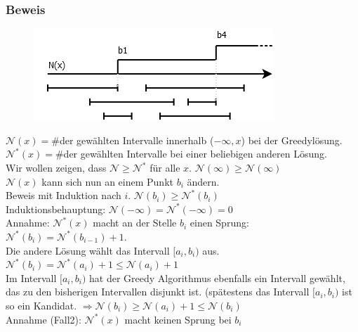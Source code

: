 \subsubsection{Beweis}
\begin{figure}[h]
    \begin{center}
        \includegraphics[width=\textwidth / 3]{../GFX/vl13_2.png}
        \label{fig:vl13_1}
    \end{center}
\end{figure}
$\mathcal{N}(x) = \#$der gewählten Intervalle innerhalb ($-\infty,x$) bei der Greedylösung.\\
$\mathcal{N}^*(x) = \#$der gewählten Intervalle bei einer beliebigen anderen Lösung.\\
Wir wollen zeigen, dass $\mathcal{N} \geq \mathcal{N}^*$ für alle $x$. $\mathcal{N}(\infty) \geq \mathcal{N}(\infty)$\\
$\mathcal{N}(x)$ kann sich nun an einem Punkt $b_i$ ändern.\\
Beweis mit Induktion nach $i$. $\mathcal{N}(b_i)\geq \mathcal{N}^*(b_i)$\\
Induktionsbehauptung: $\mathcal{N}(-\infty) = \mathcal{N}^*(-\infty) = 0$\\
Annahme: $\mathcal{N}^*(x)$ macht an der Stelle $b_i$ einen Sprung: $\mathcal{N}^*(b_i) = \mathcal{N}^*(b_{i-1})+1$.\\
Die andere Lösung wählt das Intervall $[a_i,b_i)$ aus.\\
$\mathcal{N}^*(b_i)  = \mathcal{N}^*(a_i)+1 \leq \mathcal{N}(a_i)+1$\\
Im Intervall $[a_i,b_i)$ hat der Greedy Algorithmus ebenfalls ein Intervall gewählt, das zu den bisherigen Intervallen disjunkt ist. (spätestens das Intervall $[a_i,b_i)$ ist so ein Kandidat. $\Rightarrow \mathcal{N}(b_i) \geq \mathcal{N}(a_i)+1 \leq \mathcal{N}(b_i)$ \\%
Annahme (Fall2): $\mathcal{N}^*(x) $ macht keinen Sprung bei $b_i$\\%


